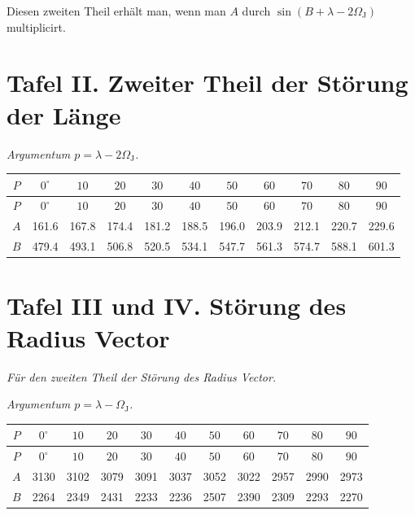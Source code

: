 \documentclass[11pt,a4paper]{book}
\begin{document}
Diesen zweiten Theil erhält man, wenn man $A$ durch $\sin(B + \lambda - 2\Omega_{\mathrm{J}})$ multiplicirt.

\section*{Tafel II. Zweiter Theil der Störung der Länge}

\textit{Argumentum $p = \lambda - 2\Omega_{\mathrm{J}}$.}

\begin{center}
\small
\begin{longtable}{|c|c|c|c|c|c|c|c|c|c|c|}
\hline
$P$ & $0^{\circ}$ & $10$ & $20$ & $30$ & $40$ & $50$ & $60$ & $70$ & $80$ & $90$ \\
\hline
\endfirsthead
\hline
$P$ & $0^{\circ}$ & $10$ & $20$ & $30$ & $40$ & $50$ & $60$ & $70$ & $80$ & $90$ \\
\hline
\endhead
$A$ & 161.6 & 167.8 & 174.4 & 181.2 & 188.5 & 196.0 & 203.9 & 212.1 & 220.7 & 229.6 \\
$B$ & 479.4 & 493.1 & 506.8 & 520.5 & 534.1 & 547.7 & 561.3 & 574.7 & 588.1 & 601.3 \\
\hline
\end{longtable}
\end{center}

\section*{Tafel III und IV. Störung des Radius Vector}

\textit{Für den zweiten Theil der Störung des Radius Vector.}

\textit{Argumentum $p = \lambda - \Omega_{\mathrm{J}}$.}

\begin{center}
\small
\begin{longtable}{|c|c|c|c|c|c|c|c|c|c|c|}
\hline
$P$ & $0^{\circ}$ & $10$ & $20$ & $30$ & $40$ & $50$ & $60$ & $70$ & $80$ & $90$ \\
\hline
\endfirsthead
\hline
$P$ & $0^{\circ}$ & $10$ & $20$ & $30$ & $40$ & $50$ & $60$ & $70$ & $80$ & $90$ \\
\hline
\endhead
$A$ & 3130 & 3102 & 3079 & 3091 & 3037 & 3052 & 3022 & 2957 & 2990 & 2973 \\
$B$ & 2264 & 2349 & 2431 & 2233 & 2236 & 2507 & 2390 & 2309 & 2293 & 2270 \\
\hline
\end{longtable}
\end{center}
\end{document}

